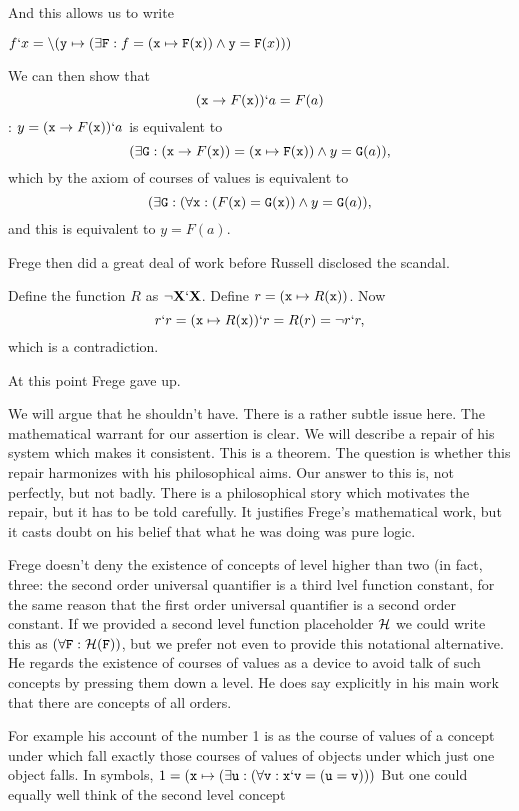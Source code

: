 \documentclass[12pt]{article}
\begin{document}
And this allows us to write 

$f`x = \backslash({\tt y}\mapsto (\exists {\tt F}: f = ({\tt x} \mapsto {\tt F}({\tt x})) \wedge {\tt y} = {\tt F}(x)))$

We can then show that $$({\tt x} \rightarrow F({\tt x}))`a = F(a)$$:  $y = ({\tt x} \rightarrow F({\tt x}))`a$ is equivalent to $$(\exists {\tt G}:  ({\tt x} \rightarrow F({\tt x}))= ({\tt x} \mapsto {\tt F}({\tt x})) \wedge y = {\tt G}(a)),$$ which by the axiom of courses of values is equivalent to $$(\exists {\tt G}:  (\forall {\tt x}:({F}({\tt x}) = {\tt G}({\tt x})) \wedge y = {\tt G}(a)),$$ and this is equivalent to $y=F(a)$.

Frege then did a great deal of work before Russell disclosed the scandal.

Define the function $R$ as $\neg {\bf X}`{\bf X}$.  Define $r = ({\tt x} \mapsto R({\tt x}))$.  Now $$r`r = ({\tt x} \mapsto R({\tt x}))`r = R(r) = \neg r`r,$$ which is a contradiction.

At this point Frege gave up.

We will argue that he shouldn't have.  There is a rather subtle issue here.  The mathematical warrant for our assertion is clear.  We will describe a repair of his system which makes it consistent.  This is a theorem.  The question is whether this repair harmonizes with his philosophical aims.  Our answer to this is, not perfectly, but not badly.  There is a philosophical story which motivates the repair, but it has to be told carefully.  It justifies Frege's mathematical work, but it casts doubt on his belief that what he was doing was pure logic.

Frege doesn't deny the existence of concepts of level higher than two (in fact, three:  the second order universal quantifier is a third lvel function constant, for the same reason that the first order universal quantifier is a second order constant.  If we provided a second level function placeholder ${\bf \cal H}$ we could write this as $(\forall {\tt F}:{\bf \cal H}({\tt F}))$, but we prefer not even to provide this notational alternative.  He regards the existence of courses of values as a device to avoid talk of such concepts by pressing them down a level.  He does say explicitly in his main work that there are concepts of all orders.

For example his account of the number 1 is as the course of values of a concept under which fall exactly those courses of values of objects under which just one object falls.
In symbols, $1 =  ({\tt x} \mapsto (\exists {\tt u}:(\forall {\tt v}:{\tt x}`{\tt v} = ({\tt u}={\tt v})))$  But one could equally well think of the second level concept 
\end{document}
